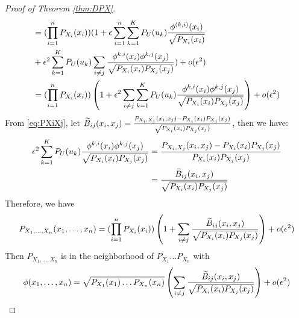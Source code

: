 \begin{proof}[Proof of Theorem \ref{thm:DPX}]
\begin{align*}
&= (\prod_{i=1}^n  P_{X_i} (x_i))
(1+\epsilon\sum_{i=1}^n \sum_{k=1}^{K} P_U(u_k){\phi^{(k,i)}(x_i) \over \sqrt{P_{X_i}(x_i)}} \\
&+\epsilon^2 \sum_{k=1}^{K} P_U(u_k)\sum_{i\neq j}{\phi^{k,i}(x_i)\phi^{k,j}(x_j)\over \sqrt{P_{X_i}(x_i)P_{X_j}(x_j)} } ) + o(\epsilon^2)\\
&= (\prod_{i=1}^n  P_{X_i} (x_i))
\left(1 +\epsilon^2\sum_{i\neq j} \sum_{k=1}^{K}P_U(u_k){\phi^{k,i}(x_i)\phi^{k,j}(x_j)\over \sqrt{P_{X_i}(x_i)P_{X_j}(x_j)} }\right) + o(\epsilon^2)
\end{align*}
From \eqref{eq:PXiXj},
let $\widetilde{B}_{ij}(x_i, x_j)={P_{X_i, X_j}(x_i,x_j) - P_{X_i}(x_i)P_{X_j}(x_j) \over \sqrt{P_{X_i}(x_i)P_{X_j}(x_j)}} $, then we have:
\begin{align}
\epsilon^2\sum_{k=1}^{K}P_U(u_k)
{\phi^{k,i}(x_i)\phi^{k,j}(x_j)\over \sqrt{P_{X_i}(x_i)P_{X_j}(x_j)} } & = {P_{X_i, X_j}(x_i, x_j) - P_{X_i}(x_i)P_{X_j}(x_j) \over P_{X_i}(x_i)P_{X_j}(x_j)} \notag\\
& = {\widetilde{B}_{ij}(x_i, x_j) \over \sqrt{P_{X_i}(x_i)P_{X_j}(x_j)} } \label{eq:Bsecond}
\end{align}
Therefore, we have 
\begin{equation}\label{eq:sep}
P_{X_1,\dots,X_n}(x_1,\dots,x_n) =  (\prod_{i=1}^n  P_{X_i} (x_i))\left ( 1 + \sum_{i\neq j}{\widetilde{B}_{ij}(x_i, x_j) \over \sqrt{P_{X_i}(x_i)P_{X_j}(x_j)} }\right) +o(\epsilon^2)
\end{equation}
Then $P_{X_1,\dots, X_n}$ is in the neighborhood of $P_{X_1}\dots P_{X_n}$ with $$\phi(x_1,\dots, x_n)=
\sqrt{P_{X_1}(x_1)\dots P_{X_n}(x_n)}\left(\sum_{i\neq j}{\widetilde{B}_{ij}(x_i, x_j) \over \sqrt{P_{X_i}(x_i)P_{X_j}(x_j)} }\right)+o(\epsilon^2)$$


\end{proof}
